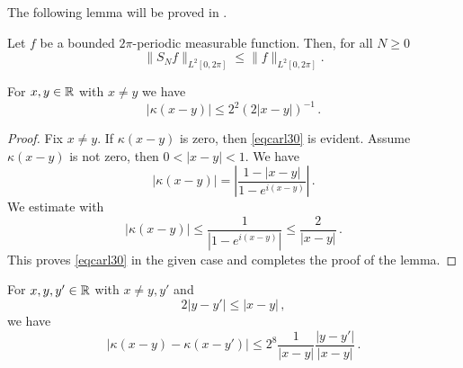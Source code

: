 The following lemma will be proved in .

\begin{lemma}
\label{spectral-projection-bound}
\leanok
{}
    Let $f$ be a bounded $2\pi$-periodic measurable function. Then, for all $N\ge 0$
   \begin{equation}\label{snbound}
   \|S_Nf\|_{L^2[0, 2\pi]} \le \|f\|_{L^2[0, 2\pi]}.
   \end{equation}
\end{lemma}

\begin{lemma}
\label{Hilbert-kernel-bound}
\leanok
{}
    For $x,y\in {\mathbb{R}}$ with $x\neq y$ we have
    \begin{equation}\label{eqcarl30}
        |\kappa(x-y)|\le 2^2(2|x-y|)^{-1}\, .
    \end{equation}
\end{lemma}
\begin{proof}
\leanok
    Fix $x\neq y$. If $\kappa(x-y)$ is zero, then \eqref{eqcarl30} is evident. Assume $\kappa(x-y)$ is not zero, then $0<|x-y|<1$.
    We have
\begin{equation}\label{eqcarl31}
|\kappa(x-y)|=\left|\frac {1-|x-y|}{1-e^{i(x-y)}}\right|\, .
\end{equation}
We estimate
with 
\begin{equation}\label{eqcarl311}
|\kappa(x-y)|\le \frac {1}{|1-e^{i(x-y)}|}\le \frac 2{|x-y|}\, .
\end{equation}
This proves \eqref{eqcarl30} in the given case and completes the proof of the lemma.
\end{proof}

\begin{lemma}
\label{Hilbert-kernel-regularity}
\leanok
{}
    For $x,y,y'\in {\mathbb{R}}$ with $x\neq y,y'$ and
    \begin{equation}
        \label{eq-close-hoelder}
        2|y-y'|\le |x-y|\, ,
    \end{equation}
    we have
    \begin{equation}\label{eqcarl301}
        |\kappa(x-y) - \kappa(x-y')|\le 2^{8}\frac{1}{|x-y|} \frac{|y-y'|}{|x-y|}\, .
    \end{equation}
\end{lemma}

